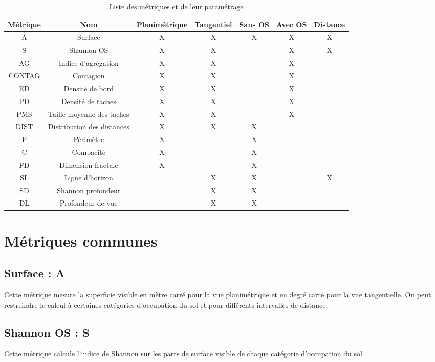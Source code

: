 \documentclass{report}
\begin{document}
\begin{table}[H]
	\begin{tabular}{|c|c|c|c|c|c|c|}
		\hline
		Métrique & Nom & Planimétrique & Tangentiel & Sans OS & Avec OS & Distance\\
		\hline
		A & Surface & X & X & X & X & X\\
		\hline
		S & Shannon OS & X & X &  & X & X\\
		\hline
		AG & Indice d'agrégation & X & X &  & X & \\
		\hline
		CONTAG & Contagion & X & X &  & X & \\
		\hline
		ED & Densité de bord & X & X &  & X & \\
		\hline
		PD & Densité de taches & X & X &  & X & \\
		\hline
		PMS & Taille moyenne des taches & X & X &  & X & \\
		\hline
		DIST & Distribution des distances & X & X & X &  & \\
		\hline
		P & Périmètre & X &  & X &  & \\
		\hline
		C & Compacité & X &  & X &  & \\
		\hline
		FD & Dimension fractale & X &  & X &  & \\
		\hline
		SL & Ligne d'horizon &  & X & X &  & X \\
		\hline
		SD & Shannon profondeur &  & X & X &  & \\
		\hline
		DL & Profondeur de vue &  & X & X &  & \\		
		\hline
	\end{tabular}
	\caption{Liste des métriques et de leur paramétrage}
	\label{metrics_tab}
\end{table}

\section{Métriques communes}

\subsection{Surface : A}
Cette métrique mesure la superficie visible en mètre carré pour la vue planimétrique et en degré carré pour la vue tangentielle. On peut restreindre le calcul à certaines catégories d'occupation du sol et pour différents intervalles de distance.


\subsection{Shannon OS : S}
Cette métrique calcule l'indice de Shannon sur les parts de surface visible de chaque catégorie d'occupation du sol.
\end{document}
